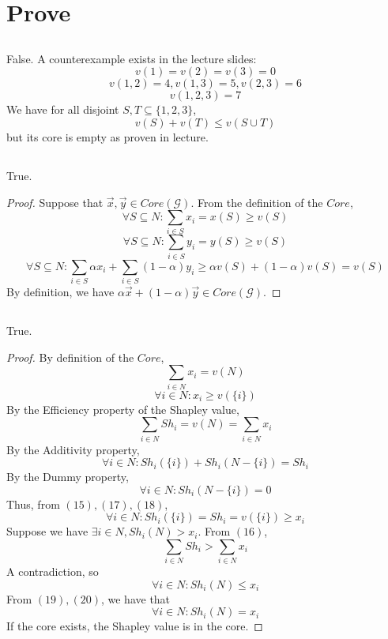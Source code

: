 \newpage
\section{Prove}
\subsection{}
False. A counterexample exists in the lecture slides:
\[v(1)=v(2)=v(3)=0\]
\[v(1,2)=4,v(1,3)=5,v(2,3)=6\]
\[v(1,2,3)=7\]
We have for all disjoint $S,T\subseteq \{1,2,3\}$,
\[v(S)+v(T)\leq v(S\cup T)\]
but its core is empty as proven in lecture.

\subsection{}
True. \\
\begin{proof}
    Suppose that $\vec{x},\vec{y}\in Core(\mathcal{G})$.
    From the definition of the $Core$,
    \[\forall S\subseteq N : \sum_{i\in S}x_i = x(S) \geq v(S)\]
    \[\forall S\subseteq N : \sum_{i\in S}y_i = y(S) \geq v(S)\]
    \[\forall S\subseteq N : 
    \sum_{i\in S}\alpha x_i + \sum_{i\in S}(1-\alpha) y_i
    \geq \alpha v(S) + (1-\alpha) v(S) = v(S)\]
    By definition, we have 
    $\alpha \vec{x} + (1-\alpha) \vec{y}\in Core(\mathcal{G})$.
\end{proof}

\subsection{}
True. \\
\begin{proof}
    By definition of the $Core$,
    \[\sum_{i\in N}x_i = v(N)\]
    \begin{equation}
        \forall i \in N : x_i \geq v(\{i\})
    \end{equation}
    By the Efficiency property of the Shapley value,
    \begin{equation}
        \sum_{i\in N} Sh_i = v(N) = \sum_{i\in N}x_i
    \end{equation}
    By the Additivity property, 
    \begin{equation}
        \forall i\in N : Sh_i(\{i\}) + Sh_i(N-\{i\}) = Sh_i
    \end{equation}
    By the Dummy property,
    \begin{equation}
        \forall i\in N : Sh_i(N-\{i\}) = 0
    \end{equation}
    Thus, from $(15), (17), (18)$,
    \begin{equation}
        \forall i\in N : Sh_i(\{i\}) = Sh_i = v(\{i\}) \geq x_i
    \end{equation}
    Suppose we have $\exists i \in N, Sh_i(N) > x_i$.
    From $(16)$,
    \[\sum_{i\in N} Sh_i > \sum_{i\in N}x_i\]
    A contradiction, so 
    \begin{equation}
        \forall i\in N : Sh_i(N) \leq x_i
    \end{equation}
    From $(19),(20)$, we have that
    \[\forall i\in N : Sh_i(N) = x_i\]
    If the core exists, the Shapley value is in the core.
\end{proof}

